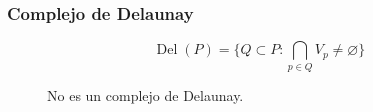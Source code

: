 \documentclass{beamer}
\DeclareMathOperator{\Del}{Del}
\begin{document}
\begin{frame}\frametitle{Complejo de Delaunay}
  \begin{Definicion}
  \begin{displaymath}
    \Del(P) = \lbrace Q\subset P \colon \bigcap_{p\in Q} V_p \ne \varnothing \rbrace
  \end{displaymath}
  \end{Definicion}
\begin{figure}[H]
\begin{columns}
  \centering{}
  \caption{\small No es un complejo de Delaunay.}
\end{columns}
\end{figure}
\end{frame}
\end{document}
